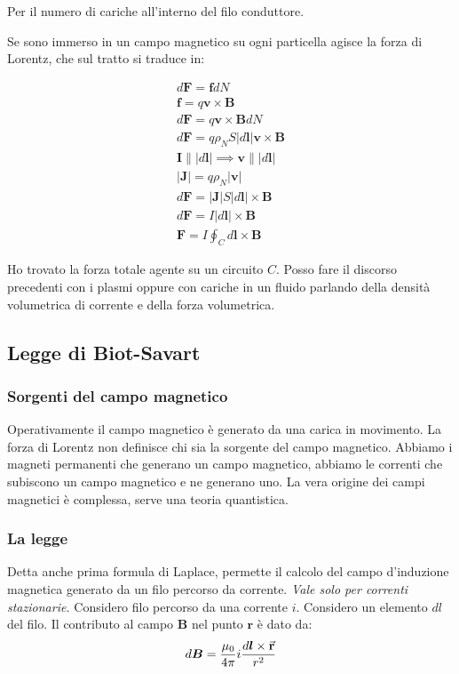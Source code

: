 \documentclass[a4paper]{scrarticle}
\begin{document}
Per il numero di cariche all'interno del filo conduttore.

Se sono immerso in un campo magnetico su ogni particella agisce la forza di Lorentz, che sul tratto si traduce in:

\begin{gather*}
    d \bm F = \bm f  dN\\
    \bm f = q \bm v \times \bm B\\
    d \bm F = q \bm v \times \bm B  dN\\
    d \bm F = q \rho_N S |d\bm l| \bm v \times \bm B\\
    \bm I \parallel |d \bm l| \implies \bm v \parallel |d \bm l|\\
    |\bm J| = q \rho_N |\bm v|\\ 
    d \bm F = |\bm J| S |d\bm l| \times \bm B\\
    d \bm F = I |d\bm l| \times \bm B\\
    \bm F = I \oint_C d\bm l \times \bm B
\end{gather*}

Ho trovato la forza totale agente su un circuito $C$.
Posso fare il discorso precedenti con i plasmi oppure  con cariche in un fluido parlando della densità volumetrica di corrente e della forza volumetrica.

\subsection{Legge di Biot-Savart}
\subsubsection*{Sorgenti del campo magnetico}

Operativamente il campo magnetico è generato da una carica in movimento. La forza di Lorentz non definisce chi sia la sorgente del campo magnetico. Abbiamo i magneti permanenti che generano un campo magnetico, abbiamo le correnti che subiscono un campo magnetico e ne generano uno. La vera origine dei campi magnetici è complessa, serve una teoria quantistica.

\subsubsection*{La legge}

Detta anche prima formula di Laplace, permette il calcolo del campo d'induzione magnetica generato da un filo percorso da corrente. \emph{Vale solo per correnti stazionarie.} 
Considero filo percorso da una corrente $i$. Considero un elemento $dl$ del filo. Il contributo al campo $\bm B$ nel punto $\bm r$ è dato da:
\begin{equation}
d \bm B = \frac{\mu_0}{4\pi}i \frac{d \bm l \times \va r}{r^2}
\end{equation}
\end{document}
